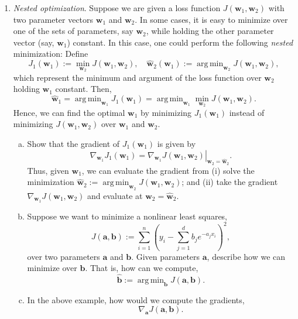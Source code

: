 \documentclass[11pt]{article}
\def\argmin{\mathop{\mathrm{arg\,min}}}
\newcommand{\abf}{\mathbf{a}}
\newcommand{\bbf}{\mathbf{b}}
\newcommand{\wbf}{\mathbf{w}}
\newcommand{\wbfhat}{\widehat{\mathbf{w}}}
\begin{document}
\begin{enumerate}
\item \emph{Nested optimization}.  Suppose we are given a loss function
$J(\wbf_1,\wbf_2)$ with two parameter vectors $\wbf_1$ and $\wbf_2$.
In some cases, it is easy to minimize over one of the sets of parameters, say
$\wbf_2$, while holding the other parameter vector (say, $\wbf_1$) constant.
In this case, one could perform the following \emph{nested} minimization:
Define
\[
    J_1(\wbf_1) := \min_{\wbf_2} J(\wbf_1,\wbf_2), \quad
    \wbfhat_2(\wbf_1) := \argmin_{\wbf_2} J(\wbf_1,\wbf_2),
\]
which represent the minimum and argument of the loss function over $\wbf_2$
holding $\wbf_1$ constant.   Then,
\[
    \wbfhat_1 = \argmin_{\wbf_1} J_1(\wbf_1) = \argmin_{\wbf_1} \min_{\wbf_2}
    J(\wbf_1,\wbf_2).
\]
Hence, we can find the optimal $\wbf_1$ by minimizing $J_1(\wbf_1)$
instead of minimizing $J(\wbf_1,\wbf_2)$ over $\wbf_1$ and $\wbf_2$.
\begin{enumerate}[(a)]
\item Show that the gradient of $J_1(\wbf_1)$ is given by
\[
    \nabla_{\wbf_1} J_1(\wbf_1) = \left. \nabla_{\wbf_1} J(\wbf_1,\wbf_2)\right|_{\wbf_2=\wbfhat_2}.
\]
Thus, given $\wbf_1$, we can evaluate the gradient from (i) solve the minimization
$\wbfhat_2:= \argmin_{\wbf_2} J(\wbf_1,\wbf_2)$; and (ii) take the gradient
$\nabla_{\wbf_1} J(\wbf_1,\wbf_2)$ and evaluate at $\wbf_2 = \wbfhat_2$.

\item Suppose we want to minimize a nonlinear least squares,
\[
    J(\abf,\bbf) := \sum_{i=1}^n \left( y_i -
        \sum_{j=1}^d b_j e^{-a_jx_i} \right)^2,
\]
over two parameters $\abf$ and $\bbf$.  Given parameters $\abf$,
describe how we can minimize over $\bbf$.  That is, how can we compute,
\[
    \hat{\bbf} := \argmin_{\bbf} J(\abf,\bbf).
\]

\item In the above example, how would we compute the gradients,
\[
    \nabla_\abf J(\abf,\bbf).
\]

\end{enumerate}

\end{enumerate}
\end{document}
